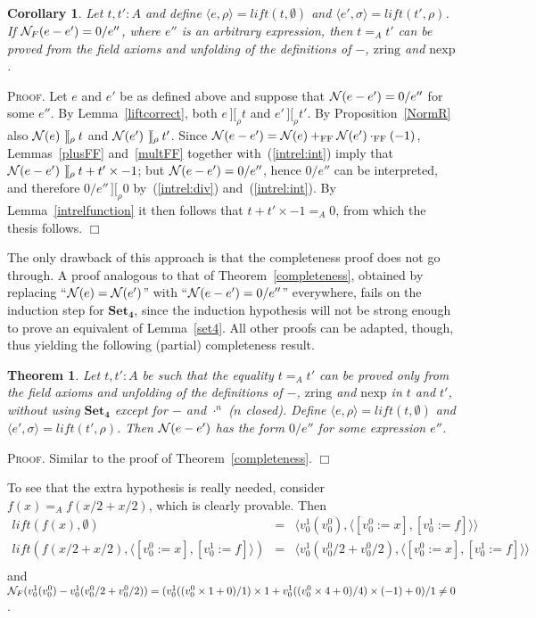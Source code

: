\documentclass{article}
\newtheorem{theorem}[definition]{Theorem}
\newtheorem{corollary}[definition]{Corollary}
\newenvironment{proof}{\smallskip\textsc{Proof.}}{\hspace*{\fill}$\Box$}
\newcommand{\intII}{\,]\![}
\newcommand{\intrel}{\mathbin{\intII_{\rho}}}
\newcommand{\N}{{\cal N}}
\newcommand{\NF}{\ensuremath{{\cal N}_{F}}}
\newcommand{\zring}{\ensuremath{\mathrm{zring}}}
\newcommand{\nexp}{\ensuremath{\mathrm{nexp}}}
\newcommand{\axiom}[1]{\ensuremath{\mathbf{#1}}}
\newcommand{\lift}{\ensuremath{\mathit{lift}}}
\newcommand{\plusFF}{\ensuremath{+_{\mathrm{FF}}}}
\newcommand{\multFF}{\ensuremath{\cdot_{\mathrm{FF}}}}
\begin{document}
\begin{corollary}\label{correctnessF1}
Let $t,t':A$ and define $\langle e,\rho\rangle=\lift(t,\emptyset)$ and
$\langle e',\sigma\rangle=\lift(t',\rho)$.  If $\NF(e-e')=0/e''$, where
$e''$ is an arbitrary expression, then $t=_A t'$ can be proved from the
field axioms and unfolding of the definitions of $-$, {\zring} and {\nexp}.
\end{corollary}
\begin{proof}
Let $e$ and $e'$ be as defined above and suppose that $\N(e-e')=0/e''$ for
some $e''$.
By Lemma~\ref{liftcorrect}, both $e\intrel t$ and $e'\intrel t'$.
By Proposition~\ref{NormR} also $\N(e)\intrel t$ and $\N(e')\intrel t'$.
Since $\N(e-e')=\N(e)\plusFF \N(e')\multFF(-1)$, Lemmas~\ref{plusFF}
and~\ref{multFF} together with~(\ref{intrel:int}) imply that
$\N(e-e')\intrel t+t'\times -1$; but $\N(e-e')=0/e''$, hence $0/e''$ can
be interpreted, and therefore $0/e''\intrel 0$ by~(\ref{intrel:div})
and~(\ref{intrel:int}).  By Lemma~\ref{intrelfunction} it then follows
that $t+t'\times -1=_A 0$, from which the thesis follows.
\end{proof}

The only drawback of this approach is that the completeness proof does not
go through.
A proof analogous to that of Theorem~\ref{completeness}, obtained by
replacing ``$\N(e)=\N(e')$'' with ``$\N(e-e')=0/e''$'' everywhere, fails
on the induction step for \axiom{Set_4}, since the induction hypothesis
will not be strong enough to prove an equivalent of Lemma~\ref{set4}.
All other proofs can be adapted, though, thus yielding the following
(partial) completeness result.

\begin{theorem}\label{completeness:field}
Let $t,t':A$ be such that the equality $t=_A t'$ can be proved
only from the field axioms and unfolding of the definitions of $-$,
$\zring$ and $\nexp$ in $t$ and $t'$, without using \axiom{Set_4} except
for $-$ and $\cdot^n$ ($n$ closed).  Define
$\langle e,\rho\rangle=\lift(t,\emptyset)$ and
$\langle e',\sigma\rangle=\lift(t',\rho)$.  Then $\N(e-e')$ has the form
$0/e''$ for some expression $e''$.
\end{theorem}
\begin{proof}
Similar to the proof of Theorem~\ref{completeness}.
\end{proof}

\bigskip
To see that the extra hypothesis is really needed, consider
$f(x)=_Af(x/2+x/2)$, which is clearly provable.  Then
\begin{eqnarray*}
\lift(f(x),\emptyset) & = &
  \langle v^1_0(v^0_0),\langle[v^0_0:=x],[v^1_0:=f]\rangle\rangle \\
\lift(f(x/2+x/2),\langle[v^0_0:=x],[v^1_0:=f]\rangle) & = &
  \langle v^1_0(v^0_0/2+v^0_0/2),\langle[v^0_0:=x],[v^1_0:=f]\rangle\rangle \\
\end{eqnarray*}
and
$\NF(v^1_0(v^0_0)-v^1_0(v^0_0/2+v^0_0/2))=%
(v^1_0((v^0_0\times 1+0)/1)\times1+v^1_0((v^0_0\times 4+0)/4)\times(-1)+0)/1%
\neq0$.
\end{document}
